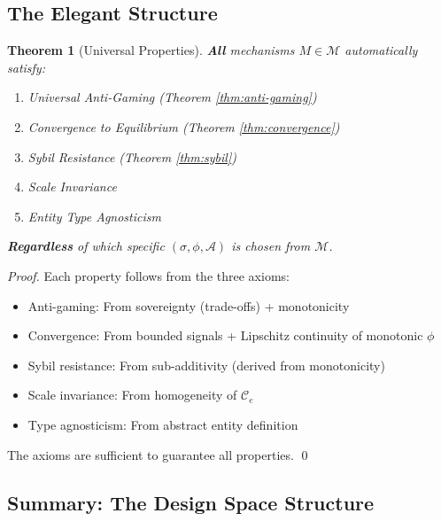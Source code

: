 \documentclass[11pt,a4paper]{article}
\newtheorem{theorem}{Theorem}[section]
\theoremstyle{definition}
\theoremstyle{remark}
\newcommand{\A}{\mathcal{A}}
\newcommand{\C}{\mathcal{C}}
\begin{document}
\subsection{The Elegant Structure}

\begin{theorem}[Universal Properties]
\label{thm:universal-properties}
\textbf{All} mechanisms $M \in \mathcal{M}$ automatically satisfy:
\begin{enumerate}
\item Universal Anti-Gaming (Theorem \ref{thm:anti-gaming})
\item Convergence to Equilibrium (Theorem \ref{thm:convergence})
\item Sybil Resistance (Theorem \ref{thm:sybil})
\item Scale Invariance
\item Entity Type Agnosticism
\end{enumerate}

\textbf{Regardless} of which specific $(\sigma, \phi, \A)$ is chosen from $\mathcal{M}$.
\end{theorem}

\begin{proof}
Each property follows from the three axioms:
\begin{itemize}
\item Anti-gaming: From sovereignty (trade-offs) + monotonicity
\item Convergence: From bounded signals + Lipschitz continuity of monotonic $\phi$
\item Sybil resistance: From sub-additivity (derived from monotonicity)
\item Scale invariance: From homogeneity of $\C_e$
\item Type agnosticism: From abstract entity definition
\end{itemize}

The axioms are sufficient to guarantee all properties. \qed
\end{proof}

\subsection{Summary: The Design Space Structure}
\end{document}
